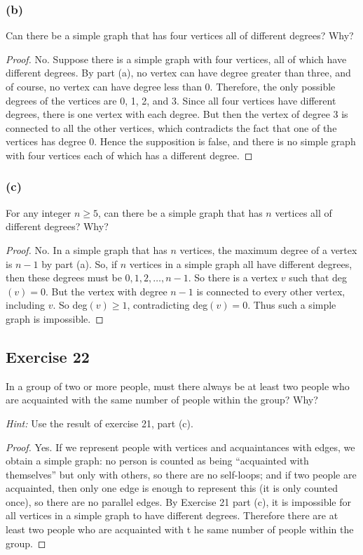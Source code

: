 \documentclass[14pt]{extarticle}
\begin{document}
\subsubsection{(b)}
Can there be a simple graph that has four vertices all of different degrees? Why?

\begin{proof}
    No. Suppose there is a simple graph with four vertices, all of which have different degrees. By part (a), no vertex can have degree greater than three, and of course, no vertex can have degree less than 0. Therefore, the only possible degrees of the vertices are 0, 1, 2, and 3. Since all four vertices have different degrees, there is one vertex with each degree. But then the vertex of degree 3 is connected to all the other vertices, which contradicts the fact that one of the vertices has degree 0. Hence the supposition is false, and there is no simple graph with four vertices each of which has a different degree.
\end{proof}

\subsubsection{(c)}
For any integer $n \geq 5$, can there be a simple graph that has $n$ vertices all of different degrees? Why?

\begin{proof}
    No. In a simple graph that has $n$ vertices, the maximum degree of a vertex is $n-1$ by part (a). So, if $n$ vertices in a simple graph all have different degrees, then these degrees must be $0, 1, 2, \ldots, n-1$. So there is a vertex $v$ such that deg$(v) = 0$. But the vertex with degree $n-1$ is connected to every other vertex, including $v$. So deg$(v) \geq 1$, contradicting deg$(v) = 0$. Thus such a simple graph is impossible.
\end{proof}

\subsection{Exercise 22}
In a group of two or more people, must there always be at least two people who are acquainted with the same number of people within the group? Why?

{\it Hint:} Use the result of exercise 21, part (c).

\begin{proof}
    Yes. If we represent people with vertices and acquaintances with edges, we obtain a simple graph: no person is counted as being ``acquainted with themselves'' but only with others, so there are no self-loops; and if two people are acquainted, then only one edge is enough to represent this (it is only counted once), so there are no parallel edges.
    By Exercise 21 part (c), it is impossible for all vertices in a simple graph to have different degrees. Therefore there are at least two people who are acquainted with t he same number of people within the group.
\end{proof}
\end{document}
